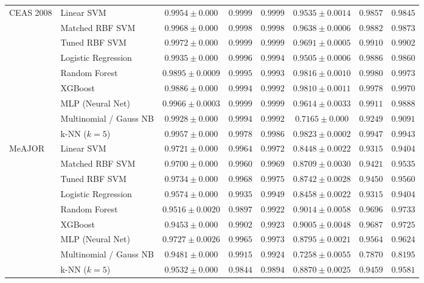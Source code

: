 \documentclass[10pt,twocolumn,letterpaper]{article}
\begin{document}
\begin{table}[t]
\begin{tabular}{llcccccc}
\midrule
\multirow{8}{*}{CEAS 2008} 
 & Linear SVM & $0.9954 \pm 0.000$ & $0.9999$ & $0.9999$ & $0.9535 \pm 0.0014$ & $0.9857$ & $0.9845$ \\
 & Matched RBF SVM & $0.9968 \pm 0.000$ & $0.9998$ & $0.9998$ & $0.9638 \pm 0.0006$ & $0.9882$ & $0.9873$ \\
 & Tuned RBF SVM & $0.9972 \pm 0.000$ & $0.9999$ & $0.9999$ & $0.9691 \pm 0.0005$ & $0.9910$ & $0.9902$ \\
 & Logistic Regression & $0.9935 \pm 0.000$ & $0.9996$ & $0.9994$ & $0.9505 \pm 0.0006$ & $0.9886$ & $0.9860$ \\
 & Random Forest & $0.9895 \pm 0.0009$ & $0.9995$ & $0.9993$ & $0.9816 \pm 0.0010$ & $0.9980$ & $0.9973$ \\
 & XGBoost & $0.9886 \pm 0.000$ & $0.9994$ & $0.9992$ & $0.9810 \pm 0.0011$ & $0.9978$ & $0.9970$ \\
 & MLP (Neural Net) & $0.9966 \pm 0.0003$ & $0.9999$ & $0.9999$ & $0.9614 \pm 0.0033$ & $0.9911$ & $0.9888$ \\
 & Multinomial / Gauss NB & $0.9928 \pm 0.000$ & $0.9994$ & $0.9992$ & $0.7165 \pm 0.000$ & $0.9249$ & $0.9091$ \\
 & k-NN ($k=5$) & $0.9957 \pm 0.000$ & $0.9978$ & $0.9986$ & $0.9823 \pm 0.0002$ & $0.9947$ & $0.9943$ \\
\midrule
\multirow{8}{*}{MeAJOR} 
 & Linear SVM & $0.9721 \pm 0.000$ & $0.9964$ & $0.9972$ & $0.8448 \pm 0.0022$ & $0.9315$ & $0.9404$ \\
 & Matched RBF SVM & $0.9700 \pm 0.000$ & $0.9960$ & $0.9969$ & $0.8709 \pm 0.0030$ & $0.9421$ & $0.9535$ \\
 & Tuned RBF SVM & $0.9734 \pm 0.000$ & $0.9968$ & $0.9975$ & $0.8742 \pm 0.0028$ & $0.9450$ & $0.9560$ \\
 & Logistic Regression & $0.9574 \pm 0.000$ & $0.9935$ & $0.9949$ & $0.8458 \pm 0.0022$ & $0.9315$ & $0.9404$ \\
 & Random Forest & $0.9516 \pm 0.0020$ & $0.9897$ & $0.9922$ & $0.9014 \pm 0.0058$ & $0.9696$ & $0.9733$ \\
 & XGBoost & $0.9453 \pm 0.000$ & $0.9902$ & $0.9923$ & $0.9005 \pm 0.0048$ & $0.9687$ & $0.9725$ \\
 & MLP (Neural Net) & $0.9727 \pm 0.0026$ & $0.9965$ & $0.9973$ & $0.8795 \pm 0.0021$ & $0.9564$ & $0.9624$ \\
 & Multinomial / Gauss NB & $0.9481 \pm 0.000$ & $0.9915$ & $0.9924$ & $0.7258 \pm 0.0055$ & $0.7870$ & $0.8195$ \\
 & k-NN ($k=5$) & $0.9532 \pm 0.000$ & $0.9844$ & $0.9894$ & $0.8870 \pm 0.0025$ & $0.9459$ & $0.9581$ \\
\bottomrule
\end{tabular}
\end{table}
\end{document}
